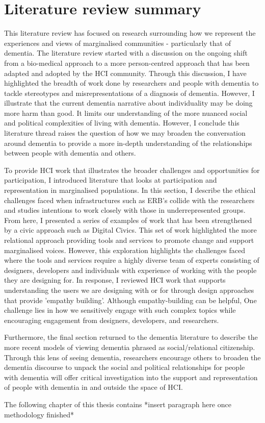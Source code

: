 \section{Literature review summary}
\label{BL:summary}

This literature review has focused on research surrounding how we represent the experiences and views of marginalised communities - particularly that of dementia. The literature review started with a discussion on the ongoing shift from a bio-medical approach to a more person-centred approach that has been adapted and adopted by the HCI community. Through this discussion, I have highlighted the breadth of work done by researchers and people with dementia to tackle stereotypes and misrepresentations of a diagnosis of dementia. However, I illustrate that the current dementia narrative about individuality may be doing more harm than good. It limits our understanding of the more nuanced social and political complexities of living with dementia. However, I conclude this literature thread raises the question of how we may broaden the conversation around dementia to provide a more in-depth understanding of the relationships between people with dementia and others.

To provide HCI work that illustrates the broader challenges and opportunities for participation, I introduced literature that looks at participation and representation in marginalised populations. In this section, I describe the ethical challenges faced when infrastructures such as ERB's collide with the researchers and studies intentions to work closely with those in underrepresented groups. From here, I presented a series of examples of work that has been strengthened by a civic approach such as Digital Civics. This set of work highlighted the more relational approach providing tools and services to promote change and support marginalised voices. However, this exploration highlights the challenges faced where the tools and services require a highly diverse team of experts consisting of designers, developers and individuals with experience of working with the people they are designing for. In response, I reviewed HCI work that supports understanding the users we are designing with or for through design approaches that provide 'empathy building'. Although empathy-building can be helpful, One challenge lies in how we sensitively engage with such complex topics while encouraging engagement from designers, developers, and researchers.


Furthermore, the final section returned to the dementia literature to describe the more recent models of viewing dementia phrased as social/relational citizenship. Through this lens of seeing dementia, researchers encourage others to broaden the dementia discourse to unpack the social and political relationships for people with dementia will offer critical investigation into the support and representation of people with dementia in and outside the space of HCI. 

The following chapter of this thesis contains *insert paragraph here once methodology finished*
